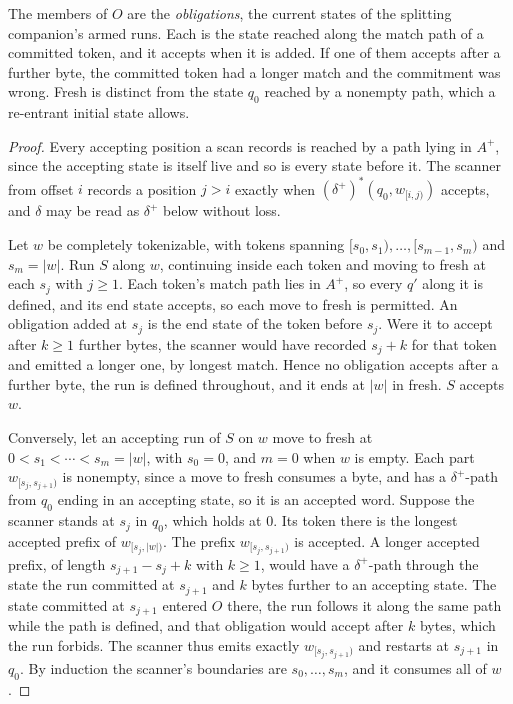 \documentclass[11pt,a4paper]{article}
\theoremstyle{definition}
\theoremstyle{plain}
\begin{document}
The members of $O$ are the \emph{obligations}, the current states of the splitting companion's armed runs. Each is the
state reached along the match path of a committed token, and it accepts when it is added. If one of them accepts after a
further byte, the committed token had a longer match and the commitment was wrong. Fresh is distinct from the state
$q_0$ reached by a nonempty path, which a re-entrant initial state allows.

\begin{proof}
Every accepting position a scan records is reached by a path lying in $A^+$, since the accepting state is itself live
and so is every state before it. The scanner from offset $i$ records a position $j > i$ exactly when
$(\delta^+)^*(q_0, w_{[i,j)})$ accepts, and $\delta$ may be read as $\delta^+$ below without loss.

Let $w$ be completely tokenizable, with tokens spanning $[s_0, s_1), \ldots, [s_{m-1}, s_m)$ and $s_m = |w|$. Run $S$
along $w$, continuing inside each token and moving to fresh at each $s_j$ with $j \geq 1$. Each token's match path lies
in $A^+$, so every $q'$ along it is defined, and its end state accepts, so each move to fresh is permitted. An
obligation added at $s_j$ is the end state of the token before $s_j$. Were it to accept after $k \geq 1$ further bytes,
the scanner would have recorded $s_j + k$ for that token and emitted a longer one, by longest match. Hence no obligation
accepts after a further byte, the run is defined throughout, and it ends at $|w|$ in fresh. $S$ accepts $w$.

Conversely, let an accepting run of $S$ on $w$ move to fresh at $0 < s_1 < \cdots < s_m = |w|$, with $s_0 = 0$, and
$m = 0$ when $w$ is empty. Each part $w_{[s_j, s_{j+1})}$ is nonempty, since a move to fresh consumes a byte, and has a
$\delta^+$-path from $q_0$ ending in an accepting state, so it is an accepted word. Suppose the scanner stands at $s_j$
in $q_0$, which holds at $0$. Its token there is the longest accepted prefix of $w_{[s_j, |w|)}$. The prefix
$w_{[s_j, s_{j+1})}$ is accepted. A longer accepted prefix, of length $s_{j+1} - s_j + k$ with $k \geq 1$, would have a
$\delta^+$-path through the state the run committed at $s_{j+1}$ and $k$ bytes further to an accepting state. The state
committed at $s_{j+1}$ entered $O$ there, the run follows it along the same path while the path is defined, and that
obligation would accept after $k$ bytes, which the run forbids. The scanner thus emits exactly $w_{[s_j, s_{j+1})}$ and
restarts at $s_{j+1}$ in $q_0$. By induction the scanner's boundaries are $s_0, \ldots, s_m$, and it consumes all of
$w$.
\end{proof}
\end{document}
